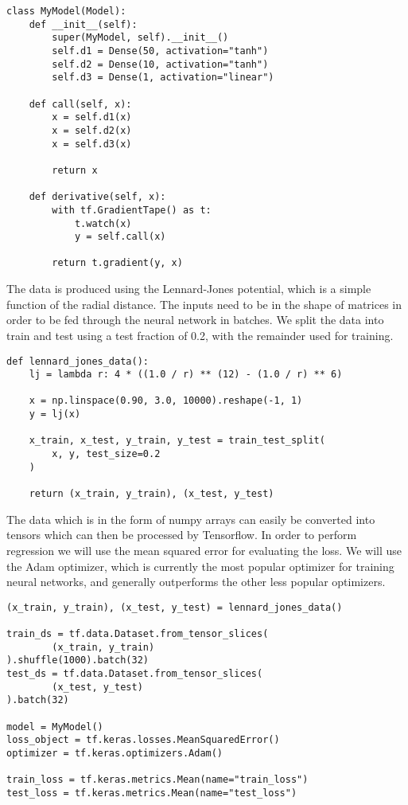 \begin{verbatim}
class MyModel(Model):
    def __init__(self):
        super(MyModel, self).__init__()
        self.d1 = Dense(50, activation="tanh")
        self.d2 = Dense(10, activation="tanh")
        self.d3 = Dense(1, activation="linear")

    def call(self, x):
        x = self.d1(x)
        x = self.d2(x)
        x = self.d3(x)

        return x

    def derivative(self, x):
        with tf.GradientTape() as t:
            t.watch(x)
            y = self.call(x)

        return t.gradient(y, x)
\end{verbatim}

The data is produced using the Lennard-Jones potential,
which is a simple function of the radial distance. The inputs
need to be in the shape of matrices in order
to be fed through the neural network in batches.
We split the data into train and test using a test fraction of 0.2,
with the remainder used for training.

\begin{verbatim}
def lennard_jones_data():
    lj = lambda r: 4 * ((1.0 / r) ** (12) - (1.0 / r) ** 6)

    x = np.linspace(0.90, 3.0, 10000).reshape(-1, 1)
    y = lj(x)

    x_train, x_test, y_train, y_test = train_test_split(
        x, y, test_size=0.2
    )

    return (x_train, y_train), (x_test, y_test)
\end{verbatim}

The data which is in the form of numpy arrays can easily
be converted into tensors which can then be processed
by Tensorflow. In order to perform regression
we will use the mean squared error for evaluating
the loss. We will use the Adam optimizer, which is currently
the most popular optimizer for training neural networks,
and generally outperforms the other less popular optimizers.

\begin{verbatim}
(x_train, y_train), (x_test, y_test) = lennard_jones_data()

train_ds = tf.data.Dataset.from_tensor_slices(
        (x_train, y_train)
).shuffle(1000).batch(32)
test_ds = tf.data.Dataset.from_tensor_slices(
        (x_test, y_test)
).batch(32)

model = MyModel()
loss_object = tf.keras.losses.MeanSquaredError()
optimizer = tf.keras.optimizers.Adam()

train_loss = tf.keras.metrics.Mean(name="train_loss")
test_loss = tf.keras.metrics.Mean(name="test_loss")
\end{verbatim}

